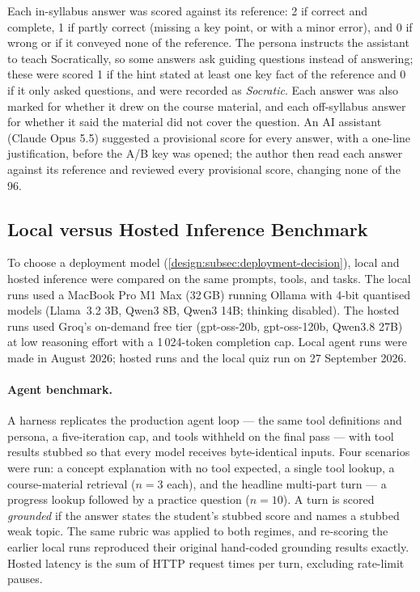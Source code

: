 Each in-syllabus answer was scored against its reference: 2 if correct and
complete, 1 if partly correct (missing a key point, or with a minor error),
and 0 if wrong or if it conveyed none of the reference. The persona instructs
the assistant to teach Socratically, so some answers ask guiding questions
instead of answering; these were scored 1 if the hint stated at least one key
fact of the reference and 0 if it only asked questions, and were recorded as
\emph{Socratic}. Each answer was also marked for whether it drew on the course
material, and each off-syllabus answer for whether it said the material did
not cover the question.
An AI assistant (Claude Opus 5.5) suggested a provisional score for every
answer, with a one-line justification, before the A/B key was opened; the
author then read each answer against its reference and reviewed every
provisional score, changing none of the 96.

\subsection{Local versus Hosted Inference Benchmark}
\label{eval:subsec:setup:providers}

To choose a deployment model (\autoref{design:subsec:deployment-decision}),
local and hosted inference were compared on the same prompts, tools, and
tasks. The local runs used a MacBook Pro M1 Max (32\,GB) running Ollama with
4-bit quantised models (Llama~3.2 3B, Qwen3 8B, Qwen3 14B; thinking
disabled). The hosted runs used Groq's on-demand free tier (gpt-oss-20b,
gpt-oss-120b, Qwen3.8 27B) at low reasoning effort with a 1\,024-token
completion cap. Local agent runs were made in August 2026; hosted runs and
the local quiz run on 27 September 2026.

\paragraph{Agent benchmark.} A harness replicates the production agent loop
--- the same tool definitions and persona, a five-iteration cap, and tools
withheld on the final pass --- with tool results stubbed so that every model
receives byte-identical inputs. Four scenarios were run: a concept
explanation with no tool expected, a single tool lookup, a course-material
retrieval ($n=3$ each), and the headline multi-part turn --- a progress
lookup followed by a practice question ($n=10$). A turn is scored
\emph{grounded} if the answer states the student's stubbed score and names a
stubbed weak topic. The same rubric was applied to both regimes, and
re-scoring the earlier local runs reproduced their original hand-coded
grounding results exactly. Hosted latency is the sum of HTTP request times
per turn, excluding rate-limit pauses.

